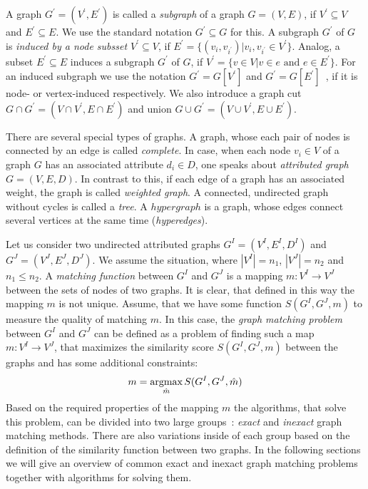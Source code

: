 A graph $G^\prime=(V^\prime,E^\prime)$ is called a \emph{subgraph} of a graph $G=(V,E)$, if $V^\prime\subseteq V$ and $E^\prime\subseteq E$. We use the standard notation $G^\prime\subseteq G$ for this. A subgraph $G^\prime$ of $G$ is \emph{induced by a node subsset $V^\prime\subseteq V$}, if $E^\prime=\{(v_i, v_{i^\prime})|v_i,v_{i^\prime}\in V^\prime\}$. Analog, a subset $E^\prime\subseteq E$ induces a subgraph $G^\prime$ of $G$, if $V^\prime=\{v\in V|v\in e\text{ and }e\in E^\prime\}$. For an induced subgraph we use the notation $G^\prime=G[V^\prime]$ and $G^\prime=G[E^\prime]$~\cite{Diestel2000}, if it is node- or vertex-induced respectively. We also introduce a graph cut $G\cap G^\prime=(V\cap V^\prime, E\cap E^\prime)$ and union $G\cup G^\prime=(V\cup V^\prime, E\cup E^\prime)$.

There are several special types of graphs. A graph, whose each pair of nodes is connected by an edge is called \emph{complete}. In case, when each node $v_i\in V$ of a graph $G$ has an associated attribute $d_i\in D$, one speaks about \emph{attributed graph} $G=(V,E,D)$. In contrast to this, if each edge of a graph has an associated weight, the graph is called \emph{weighted graph}. A connected, undirected graph without cycles is called a \emph{tree}. A $hypergraph$ is a graph, whose edges connect several vertices at the same time (\emph{hyperedges}).

Let us consider two undirected attributed graphs $G^I = (V^I, E^I, D^I)$ and $G^J = (V^J, E^J,D^J)$. We assume the situation, where $|V^I|=n_1$, $|V^J|=n_2$ and $n_1\le n_2$. A \emph{matching function} between $G^I$ and $G^J$ is a mapping $m:V^I\rightarrow V^J$ between the sets of nodes of two graphs.
It is clear, that defined in this way the mapping $m$ is not unique. Assume, that we have some function $S(G^I, G^J, m)$ to measure the quality of matching $m$. In this case, the \emph{graph matching problem} between $G^I$ and $G^J$ can be defined as a problem of finding such a map $m:V^I\rightarrow V^J$, that maximizes the similarity score $S(G^I, G^J, m)$ between the graphs and has some additional constraints:
\begin{equation} \label{gGMP}
m = \mathop{\rm argmax}_{\hat{m}}S(G^I, G^J, \hat{m})
\end{equation}
Based on the required properties of the mapping $m$ the algorithms, that solve this problem, can be divided into two large groups~\cite{Conte2004}: \emph{exact} and \emph{inexact} graph matching methods. There are also variations inside of each group based on the definition of the similarity function between two graphs. In the following sections we will give an overview of common exact and inexact graph matching problems together with algorithms for solving them.
